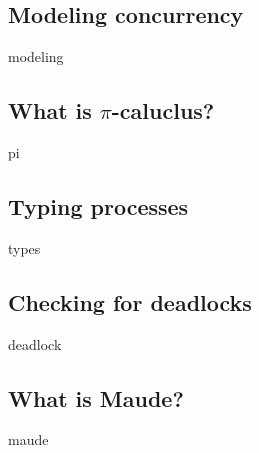 \subsection{Modeling concurrency}
{modeling}

\subsection{What is \texorpdfstring{$\pi$}{pi}-caluclus?}
{pi}


\subsection{Typing processes}
{types}

\subsection{Checking for deadlocks}
{deadlock}

\subsection{What is Maude?}
\label{whatismaude}
{maude}